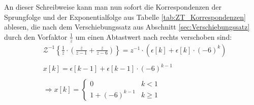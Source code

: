 An dieser Schreibweise kann man nun sofort die Korrespondenzen der Sprungfolge und der Exponentialfolge aus Tabelle \ref{tab:ZT_Korrespondenzen} ablesen, die nach dem Verschiebungssatz aus Abschnitt \ref{sec:Verschiebungssatz} durch den Vorfaktor $\frac{1}{z}$ um einen Abtastwert nach rechts verschoben sind:
\begin{equation}
\begin{aligned}
    &\mathcal{Z}^{-1}\left\{\frac{1}{z} \cdot \left(\frac{z}{z-1} + \frac{z}{z-6}\right)\right\} = z^{-1}\cdot\left( \epsilon[k] + \epsilon[k]\cdot(-6)^{k}\right) \\
    \\
    & x[k] = \epsilon[k-1] + \epsilon[k-1]\cdot(-6)^{k-1} \\ \\
    &\Rightarrow x[k] = \begin{cases}
        0 & k < 1 \\
        1 + (-6)^{k-1} & k \geq 1
    \end{cases}
\end{aligned}
\end{equation}

